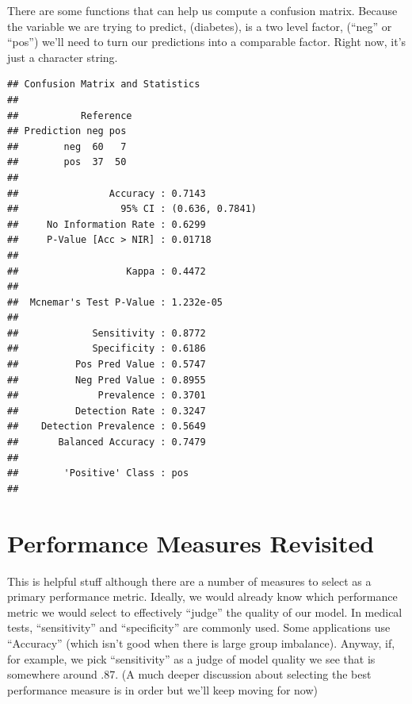 \documentclass[]{book}
\newenvironment{Shaded}{\begin{snugshade}}{\end{snugshade}}
\newcommand{\KeywordTok}[1]{\textcolor[rgb]{0.13,0.29,0.53}{\textbf{#1}}}
\newcommand{\DataTypeTok}[1]{\textcolor[rgb]{0.13,0.29,0.53}{#1}}
\newcommand{\StringTok}[1]{\textcolor[rgb]{0.31,0.60,0.02}{#1}}
\newcommand{\CommentTok}[1]{\textcolor[rgb]{0.56,0.35,0.01}{\textit{#1}}}
\newcommand{\OperatorTok}[1]{\textcolor[rgb]{0.81,0.36,0.00}{\textbf{#1}}}
\newcommand{\NormalTok}[1]{#1}
\begin{document}
There are some functions that can help us compute a confusion matrix.
Because the variable we are trying to predict, (diabetes), is a two
level factor, (``neg'' or ``pos'') we'll need to turn our predictions
into a comparable factor. Right now, it's just a character string.

\begin{Shaded}
\end{Shaded}

\begin{verbatim}
## Confusion Matrix and Statistics
## 
##           Reference
## Prediction neg pos
##        neg  60   7
##        pos  37  50
##                                          
##                Accuracy : 0.7143         
##                  95% CI : (0.636, 0.7841)
##     No Information Rate : 0.6299         
##     P-Value [Acc > NIR] : 0.01718        
##                                          
##                   Kappa : 0.4472         
##                                          
##  Mcnemar's Test P-Value : 1.232e-05      
##                                          
##             Sensitivity : 0.8772         
##             Specificity : 0.6186         
##          Pos Pred Value : 0.5747         
##          Neg Pred Value : 0.8955         
##              Prevalence : 0.3701         
##          Detection Rate : 0.3247         
##    Detection Prevalence : 0.5649         
##       Balanced Accuracy : 0.7479         
##                                          
##        'Positive' Class : pos            
## 
\end{verbatim}

\section{Performance Measures
Revisited}\label{performance-measures-revisited}

This is helpful stuff although there are a number of measures to select
as a primary performance metric. Ideally, we would already know which
performance metric we would select to effectively ``judge'' the quality
of our model. In medical tests, ``sensitivity'' and ``specificity'' are
commonly used. Some applications use ``Accuracy'' (which isn't good when
there is large group imbalance). Anyway, if, for example, we pick
``sensitivity'' as a judge of model quality we see that is somewhere
around .87. (A much deeper discussion about selecting the best
performance measure is in order but we'll keep moving for now)
\end{document}
